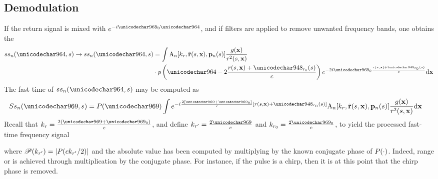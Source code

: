 \subsection{Demodulation}
If the return signal is mixed with $\eex{-\im\omega_0\fasttime}$, and if filters are applied to remove unwanted frequency bands, one obtains the 
\begin{equation}
\begin{split}
 \stst{\channelIndex}(\fasttime,\parm)\rightarrow \stst{\channelIndex}(\fasttime,\parm)&=\int\pattern{\channelIndex}[\kr, \uRangeVectorParm, \pAntennaParm{\channelIndex}]\frac{\reflectivity(\vct\target)}{\amplitude\range^2(\parm, \targetnoparm)}\\&\cdot\envelope\left(\fasttime-2\frac{\amplitude\range(\parm, \targetnoparm)+\rangeErrorZero(\parm)}{c}\right)
 \eex{-2\im\omega_0\frac{\amplitude\range(\parm, \targetnoparm)+\rangeErrorZero(\parm)}{c}}\d\vct\target
 \label{eq:fasttime1}
 \end{split}
\end{equation}
The fast-time  of $\stst{\channelIndex}(\fasttime,\parm)$ may be computed as
\begin{equation}
\begin{split}
 \Sfst{\channelIndex}(\omega,\parm) &= 	\Envelope(\omega)\int\eex{-\im\frac{2[\omega+\omega_0]}{c}[\amplitude\range(\parm, \targetnoparm)+\rangeErrorZero(\parm)]}\pattern{\channelIndex}[\kr, \uRangeVectorParm, \pAntennaParm{\channelIndex}]\frac{\reflectivity(\vct\target)}{\amplitude\range^2(\parm, \targetnoparm)}\d\vct\target
 \end{split}
\end{equation}
Recall that $\kr=\frac{2(\omega+\omega_0)}{c}$, and define $\krc = \frac{2\omega}{c}$ and $\krnaught = \frac{2\omega_0}{c}$, to yield the processed fast-time frequency signal
\begin{center}
\end{center}
where $\mathscr{P}(k_{r'}) = \lvert P(ck_{r'}/2)\rvert$ and the absolute value has been computed by multiplying by the known conjugate phase of $P(\cdot)$. Indeed, range or  is achieved through multiplication by the conjugate phase. For instance, if the pulse is a chirp, then it is at this point that the chirp phase is removed.
